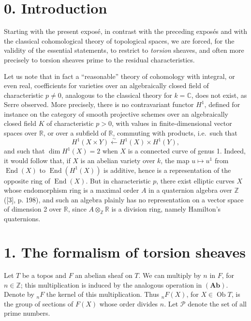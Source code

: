 \documentclass[11pt]{article}
\newcommand{\Zz}{\mathbb{Z}}
\newcommand{\Rr}{\mathbb{R}}
\newcommand{\Cc}{\mathbb{C}}
\newcommand{\End}{\operatorname{End}}
\newcommand{\Ob}{\operatorname{Ob}}
\newcommand{\ie}{i.e.\ }
\begin{document}
\bigskip

\section*{0. Introduction}

Starting with the present expos\'e, in contrast with the preceding expos\'es and with the classical cohomological theory of topological spaces, we are forced, for the validity of the essential statements, to restrict to \emph{torsion} sheaves, and often more precisely to torsion sheaves prime to the residual characteristics.

Let us note that in fact a ``reasonable'' theory of cohomology with integral, or even real, coefficients for varieties over an algebraically closed field of characteristic \(p\ne 0\), analogous to the classical theory for \(k=\Cc\), does not exist, as Serre observed. More precisely, there is no contravariant functor \(H^1\), defined for instance on the category of smooth projective schemes over an algebraically closed field \(K\) of characteristic \(p>0\), with values in finite-dimensional vector spaces over \(\Rr\), or over a subfield of \(\Rr\), commuting with products, \ie such that
\[
H^1(X\times Y)\xleftarrow{\sim}H^1(X)\times H^1(Y),
\]
and such that \(\dim H^1(X)=2\) when \(X\) is a connected curve of genus 1. Indeed, it would follow that, if \(X\) is an abelian variety over \(k\), the map \(u\mapsto u^1\) from \(\End(X)\) to \(\End(H^1(X))\) is additive, hence is a representation of the opposite ring of \(\End(X)\). But in characteristic \(p\), there exist elliptic curves \(X\) whose endomorphism ring is a maximal order \(A\) in a quaternion algebra over \(\Zz\) ([3], p. 198), and such an algebra plainly has no representation on a vector space of dimension 2 over \(\Rr\), since \(A\otimes_{\Zz}\Rr\) is a division ring, namely Hamilton's quaternions.

\section*{1. The formalism of torsion sheaves}

Let \(T\) be a topos and \(F\) an abelian sheaf on \(T\). We can multiply by \(n\) in \(F\), for \(n\in\Zz\); this multiplication is induced by the analogous operation in \((\mathbf{Ab})\). Denote by \({}_nF\) the kernel of this multiplication. Thus \({}_nF(X)\), for \(X\in\Ob T\), is the group of sections of \(F(X)\) whose order divides \(n\). Let \(\mathcal P\) denote the set of all prime numbers.
\end{document}
